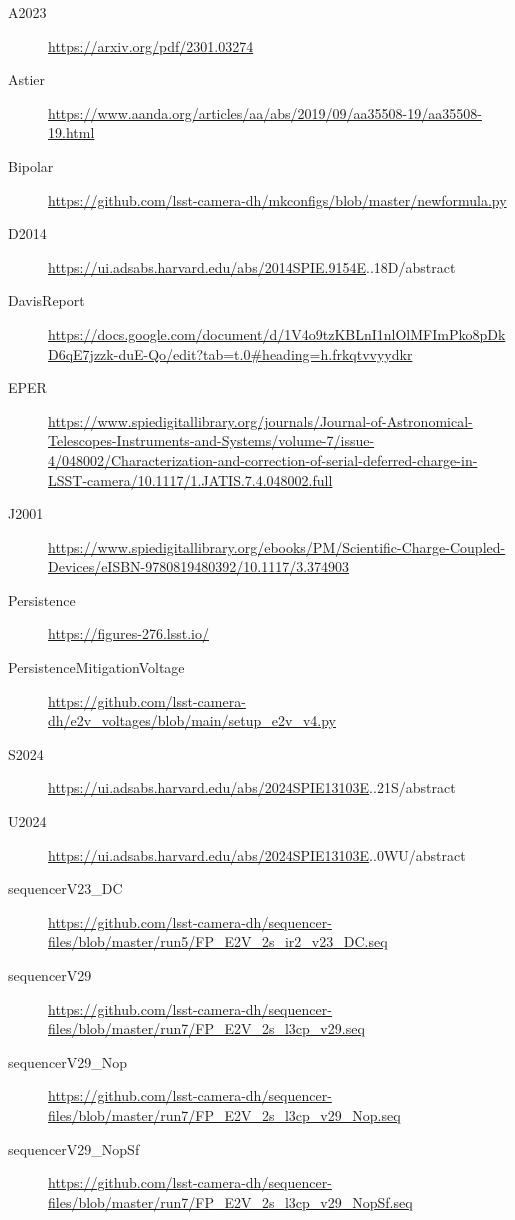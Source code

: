 \begin{description}
\item[\label{A2023}{A2023}]
\url{https://arxiv.org/pdf/2301.03274}
\item[\label{Astier}{Astier}]
\url{https://www.aanda.org/articles/aa/abs/2019/09/aa35508-19/aa35508-19.html}
\item[\label{Bipolar}{Bipolar}]
\url{https://github.com/lsst-camera-dh/mkconfigs/blob/master/newformula.py}
\item[\label{D2014}{D2014}]
\url{https://ui.adsabs.harvard.edu/abs/2014SPIE.9154E}..18D/abstract
\item[\label{DavisReport}{DavisReport}]
\url{https://docs.google.com/document/d/1V4o9tzKBLnI1nlOlMFImPko8pDkD6qE7jzzk-duE-Qo/edit?tab=t.0\#heading=h.frkqtvvyydkr}
\item[\label{EPER}{EPER}]
\url{https://www.spiedigitallibrary.org/journals/Journal-of-Astronomical-Telescopes-Instruments-and-Systems/volume-7/issue-4/048002/Characterization-and-correction-of-serial-deferred-charge-in-LSST-camera/10.1117/1.JATIS.7.4.048002.full}
\item[\label{J2001}{J2001}]
\url{https://www.spiedigitallibrary.org/ebooks/PM/Scientific-Charge-Coupled-Devices/eISBN-9780819480392/10.1117/3.374903}
\item[\label{Persistence}{Persistence}]
\url{https://figures-276.lsst.io/}
\item[\label{PersistenceMitigationVoltage}{PersistenceMitigationVoltage}]
\url{https://github.com/lsst-camera-dh/e2v_voltages/blob/main/setup_e2v_v4.py}
\item[\label{S2024}{S2024}]
\url{https://ui.adsabs.harvard.edu/abs/2024SPIE13103E}..21S/abstract
\item[\label{U2024}{U2024}]
\url{https://ui.adsabs.harvard.edu/abs/2024SPIE13103E}..0WU/abstract
\item[\label{sequencerV23_DC}{sequencerV23\_DC}]
\url{https://github.com/lsst-camera-dh/sequencer-files/blob/master/run5/FP_E2V_2s_ir2_v23_DC.seq}
\item[\label{sequencerV29}{sequencerV29}]
\url{https://github.com/lsst-camera-dh/sequencer-files/blob/master/run7/FP_E2V_2s_l3cp_v29.seq}
\item[\label{sequencerV29_Nop}{sequencerV29\_Nop}]
\url{https://github.com/lsst-camera-dh/sequencer-files/blob/master/run7/FP_E2V_2s_l3cp_v29_Nop.seq}
\item[\label{sequencerV29_NopSf}{sequencerV29\_NopSf}]
\url{https://github.com/lsst-camera-dh/sequencer-files/blob/master/run7/FP_E2V_2s_l3cp_v29_NopSf.seq}
\end{description}

